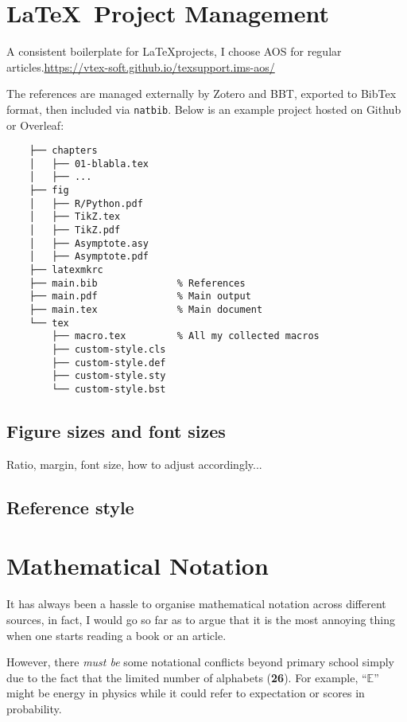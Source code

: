 \newpage


\section{\LaTeX\ Project Management}

A consistent boilerplate for \LaTeX projects,
I choose AOS for regular articles.\url{https://vtex-soft.github.io/texsupport.ims-aos/}

The references are managed externally by Zotero and BBT,
exported to BibTex format,
then included via \verb|natbib|.
Below is an example project hosted on Github or Overleaf:

\begin{Verbatim}
    ├── chapters
    │   ├── 01-blabla.tex
    │   ├── ...
    ├── fig
    │   ├── R/Python.pdf
    │   ├── TikZ.tex
    │   ├── TikZ.pdf
    │   ├── Asymptote.asy
    │   ├── Asymptote.pdf
    ├── latexmkrc
    ├── main.bib              % References
    ├── main.pdf              % Main output
    ├── main.tex              % Main document
    └── tex
        ├── macro.tex         % All my collected macros
        ├── custom-style.cls
        ├── custom-style.def
        ├── custom-style.sty
        └── custom-style.bst
\end{Verbatim}

\subsection{Figure sizes and font sizes}

Ratio, margin, font size, how to adjust accordingly...

\subsection{Reference style}

\section{Mathematical Notation}

It has always been a hassle to organise mathematical notation across different sources,
in fact, I would go so far as to argue that it is the most annoying thing
when one starts reading a book or an article.

However, there \textit{must be} some notational conflicts beyond primary school
simply due to the fact that the limited number of alphabets (\textbf{26}).
For example, ``$\mathbb{E}$'' might be energy in physics
while it could refer to expectation or scores in probability.

